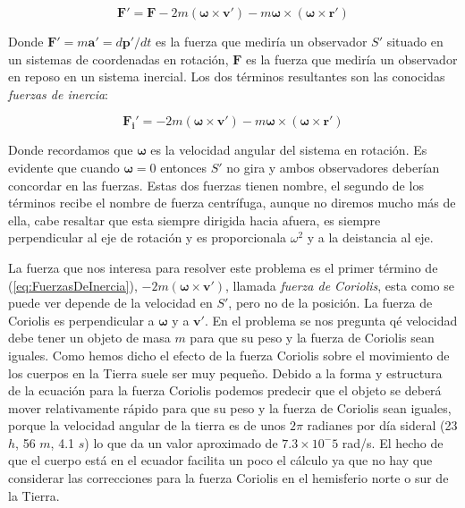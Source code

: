 \documentclass[a4paper,10pt]{article}
\numberwithin{equation}{section}
\begin{document}
\begin{equation}
 \mathbf{F'} = \mathbf{F} - 2m(\mathbf{\omega} \times \mathbf{v'}) - m\mathbf{\omega} \times (\mathbf{\omega} \times \mathbf{r'})
 \label{eq:FuerzasDeSistemaRotacion}
\end{equation}

Donde $\mathbf{F'} = m\mathbf{a'} = d\mathbf{p'}/dt$ es la fuerza que mediría un observador $S'$ situado
en un sistemas de coordenadas en rotación, $\mathbf{F}$ es la fuerza que mediría un observador
en reposo en un sistema inercial. Los dos términos resultantes son las conocidas \emph{fuerzas de inercia}:

\begin{equation}
 \mathbf{F_i'} = - 2m(\mathbf{\omega} \times \mathbf{v'}) - m\mathbf{\omega} \times (\mathbf{\omega} \times \mathbf{r'})
 \label{eq:FuerzasDeInercia}
\end{equation}

Donde recordamos que $\mathbf{\omega}$ es la velocidad angular del sistema en rotación. Es evidente que cuando $\mathbf{\omega} = 0$
entonces $S'$ no gira y ambos observadores deberían concordar en las fuerzas. Estas dos fuerzas tienen nombre, el segundo de los términos
recibe el nombre de fuerza centrífuga, aunque no diremos mucho más de ella, cabe resaltar que esta siempre dirigida hacia
afuera, es siempre perpendicular al eje de rotación y es proporcionala $\omega^2$ y a la deistancia al eje.

\vspace{.3cm}

La fuerza que nos interesa para resolver este problema es el primer término de (\ref{eq:FuerzasDeInercia}), $- 2m(\mathbf{\omega} \times \mathbf{v'})$,
llamada \emph{fuerza de Coriolis}, esta como se puede ver depende de la velocidad en $S'$, pero no de la posición. La fuerza de Coriolis 
es perpendicular a $\mathbf{\omega}$ y a $\mathbf{v'}$. En el problema se nos pregunta qé velocidad debe tener un objeto de masa $m$ para que su peso 
y la fuerza de Coriolis sean iguales. Como hemos dicho el efecto de la fuerza Coriolis sobre el movimiento de los cuerpos en la Tierra 
suele ser muy pequeño. Debido a la forma y estructura de la ecuación para la fuerza Coriolis podemos predecir que el objeto se deberá mover 
relativamente rápido para que su peso y la fuerza de Coriolis sean iguales, porque la velocidad angular de la tierra es de unos $2\pi$ 
radianes por día sideral (23 $h$, 56 $m$, 4.1 $s$) lo que da un valor aproximado de $7.3 \times 10^-5$ rad/s. El hecho de que el
cuerpo está en el ecuador facilita un poco el cálculo ya que no hay que considerar las correcciones para la fuerza Coriolis en el
hemisferio norte o sur de la Tierra.
\end{document}

